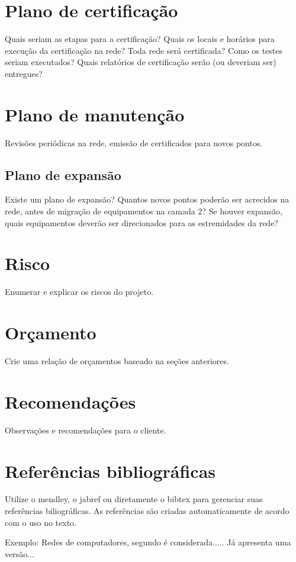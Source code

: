 \documentclass[	DIV=calc,%
paper=a4,%
fontsize=12pt,%
onecolumn]{scrartcl}	 					%
\begin{document}
	\section{Plano de certificação}
	Quais seriam as etapas para a certificação? 
	Quais os locais e horários para execução da certificação na rede? Toda rede será certificada?
	Como os testes seriam executados?
	Quais relatórios de certificação serão (ou deveriam ser) entregues? 
	
	\section{Plano de manutenção}
	
	Revisões periódicas na rede, emissão de certificados para novos pontos.
	
	\subsection{Plano de expansão}
	Existe um plano de expansão? Quantos novos pontos poderão ser acrecidos na rede, antes de migração de equipamentos na camada 2? Se houver expansão, quais equipamentos deverão ser direcionados para as estremidades da rede? 
	
	\section{Risco}
	Enumerar e explicar os riscos do projeto.
	
	\section{Orçamento}
	Crie uma relação de orçamentos baseado na seções anteriores.
	
	\section{Recomendações}
	Observações e recomendações para o cliente.
	
	\section{Referências bibliográficas}
	Utilize o mendley, o jabref ou diretamente o bibtex para gerenciar suas referências biliográficas. As referências são criadas automaticamente de acordo com o uso no texto.
	
	Exemplo: Redes de computadores, segundo \cite{t2013} é considerada..... Já \cite{kurose2010} apresenta uma versão...
	
\end{document}
